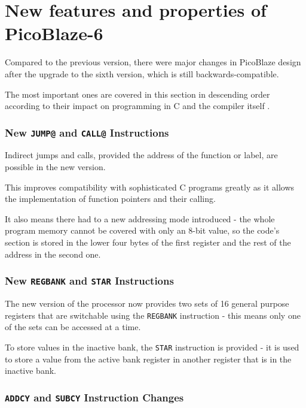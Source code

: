     \section{New features and properties of PicoBlaze-6}\label{kcpsm6cmp}

    Compared to the previous version, there were major changes in PicoBlaze design after the upgrade to the sixth version, which is still backwards-compatible.

    The most important ones are covered in this section in descending order according to their impact on programming in C and the compiler itself \cite{PicoBlaze6}.

        \subsubsection{New \texttt{JUMP@} and \texttt{CALL@} Instructions}\label{jumpat}

        Indirect jumps and calls, provided the address of the function or label, are possible in the new version.

        This improves compatibility with sophisticated C programs greatly as it allows the implementation of function pointers and their calling.

        It also means there had to a new addressing mode introduced - the whole program memory cannot be covered with only an 8-bit value, so the code's section is stored in the lower four bytes of the first register and the rest of the address in the second one.

        \subsubsection{New \texttt{REGBANK} and \texttt{STAR} Instructions}

        The new version of the processor now provides two sets of 16 general purpose registers that are switchable using the \texttt{REGBANK} instruction - this means only one of the sets can be accessed at a time.

        To store values in the inactive bank, the \texttt{STAR} instruction is provided - it is used to store a value from the active bank register in another register that is in the inactive bank.

        \subsubsection{\texttt{ADDCY} and \texttt{SUBCY} Instruction Changes}

